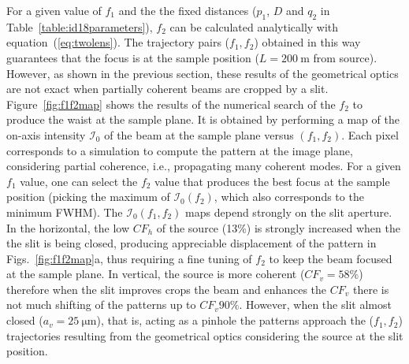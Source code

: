 \documentclass[9pt,twocolumn,twoside]{osajnl}
\begin{document}
For a given value of $f_1$ and the the fixed distances ($p_1$, $D$ and $q_2$ in Table~\ref{table:id18parameters}), $f_2$ can be calculated analytically with equation~(\ref{eq:twolens}). The trajectory pairs ($f_1,f_2$) obtained in this way  
guarantees that the focus is at the sample position ($L= \SI{200}{\meter}$ from source). However, as shown in the previous section, these results of the geometrical optics are not exact when partially coherent beams are cropped by a slit. 
Figure~\ref{fig:f1f2map} shows the results of the numerical search of the $f_2$ to produce the waist at the sample plane. It is obtained by performing a map of the on-axis intensity $\mathcal{I}_0$ of the beam at the sample plane versus $(f_1,f_2)$. Each pixel corresponds to a simulation to compute the pattern at the image plane, considering partial coherence, i.e., propagating many coherent modes. For a given $f_1$ value, one can select the $f_2$ value that produces the best focus at the sample position (picking the maximum of $\mathcal{I}_0(f_2)$, which also corresponds to the minimum FWHM). 
The $\mathcal{I}_0(f_1,f_2)$ maps depend strongly on the slit aperture. In the horizontal, the low $CF_h$ of the source (13\%) is strongly increased when the the slit is being closed, producing appreciable displacement of the pattern in Figs.~\ref{fig:f1f2map}a, thus requiring a fine tuning of $f_2$ to keep the beam focused at the sample plane. In vertical, the source is more coherent ($CF_v=58\%$) therefore when the slit improves crops the beam and enhances the $CF_v$ there is not much shifting of the patterns up to $CF_v 90\%$. However, when the slit almost closed ($a_v=\SI{25}{\micro\meter}$), that is, acting as a pinhole the patterns approach the ($f_1,f_2$) trajectories resulting from the geometrical optics considering the source at the slit position.





\end{document}
